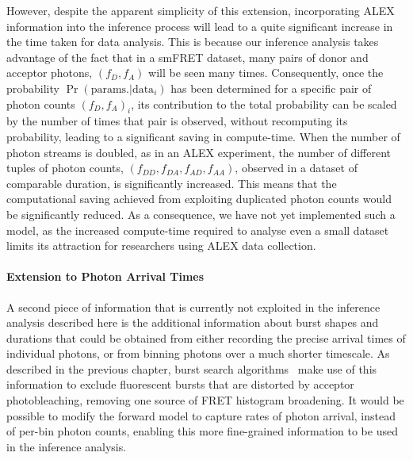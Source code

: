 However, despite the apparent simplicity of this extension, incorporating ALEX information into the inference process will lead to a quite significant increase in the time taken for data analysis. This is because our inference analysis takes advantage of the fact that in a smFRET dataset, many pairs of donor and acceptor photons, $(f_D, f_A)$ will be seen many times. Consequently, once the probability $\Pr(\text{params.}|\text{data}_i)$ has been determined for a specific pair of photon counts $(f_D, f_A)_i$, its contribution to the total probability can be scaled by the number of times that pair is observed, without recomputing its probability, leading to a significant saving in compute-time. When the number of photon streams is doubled, as in an ALEX experiment, the number of different tuples of photon counts, $(f_{DD}, f_{DA}, f_{AD}, f_{AA})$, observed in a dataset of comparable duration, is significantly increased. This means that the computational saving achieved from exploiting duplicated photon counts would be significantly reduced. As a consequence, we have not yet implemented such a model, as the increased compute-time required to analyse even a small dataset limits its attraction for researchers using ALEX data collection.   

\paragraph{Extension to Photon Arrival Times}
A second piece of information that is currently not exploited in the inference analysis described here is the additional information about burst shapes and durations that could be obtained from either recording the precise arrival times of individual photons, or from binning photons over a much shorter timescale. As described in the previous chapter, burst search algorithms~\cite{nir06} make use of this information to exclude fluorescent bursts that are distorted by acceptor photobleaching, removing one source of FRET histogram broadening. It would be possible to modify the forward model to capture rates of photon arrival, instead of per-bin photon counts, enabling this more fine-grained information to be used in the inference analysis.

